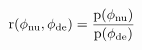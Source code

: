 \begin{equation*}
  \pdr(\phinu, \phide) = \frac {
    \pd(\phinu)
  } {
    \pd(\phide)
  }
\end{equation*}